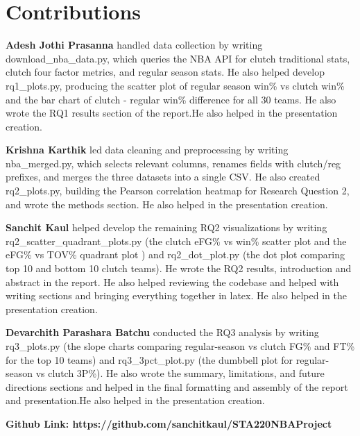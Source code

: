 \newpage
\section*{Contributions}

\begin{sloppypar}
\textbf{Adesh Jothi Prasanna} handled data collection by writing download\_nba\_data.py, which queries the NBA API for 
clutch traditional stats, clutch four factor metrics, and regular season stats. He 
also helped develop rq1\_plots.py, producing the scatter plot of regular season win\% vs clutch win\% and the bar chart of 
clutch - regular win\% difference for all 30 teams. He also wrote the RQ1 results section of the report.He also helped in the presentation creation.

\textbf{Krishna Karthik} led data cleaning and preprocessing by writing nba\_merged.py, which selects relevant columns, 
renames fields with clutch/reg prefixes, and merges the three datasets into a single  CSV. He also created 
rq2\_plots.py, building the Pearson correlation heatmap for Research Question 2, 
and wrote the methods section. He also helped in the presentation creation.

\textbf{Sanchit Kaul} helped develop the remaining RQ2 visualizations by writing rq2\_scatter\_quadrant\_plots.py (the 
clutch eFG\% vs win\% scatter plot and the eFG\% vs TOV\% quadrant plot ) and rq2\_dot\_plot.py 
(the dot plot comparing top 10 and bottom 10 clutch teams). He wrote the RQ2 results, 
introduction and abstract in the report. He also helped reviewing the codebase and helped with writing sections and 
bringing everything together in latex. He also helped in the presentation creation.

\textbf{Devarchith Parashara Batchu} conducted the RQ3 analysis by writing rq3\_plots.py (the slope charts comparing 
regular-season vs clutch FG\% and FT\% for the top 10 teams) and rq3\_3pct\_plot.py (the dumbbell plot for 
regular-season vs clutch 3P\%). He also wrote the summary, limitations, and future directions sections and 
helped in the final formatting and assembly of the report and presentation.He also helped in the presentation creation.


\vspace{1em}
\textbf{Github Link: https://github.com/sanchitkaul/STA220NBAProject}
\end{sloppypar}
\newpage
